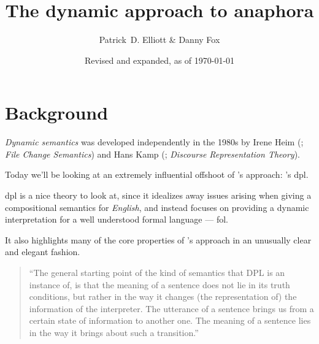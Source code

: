 \documentclass[nols,twoside,nofonts,nobib,nohyper]{tufte-handout}
\title{The dynamic approach to anaphora}
\date{Revised and expanded, as of {\today}}
\author[Patrick D. Elliott \& Danny Fox]{Patrick~D. Elliott \& Danny Fox}
\theoremstyle{definition}
\begin{document}
\maketitle%

\section{Background}

\textit{Dynamic semantics} was developed independently in the 1980s by Irene Heim (\citeyear{Heim1982}; \textit{File Change Semantics}) and Hans Kamp (\citeyear{Kamp1981}; \textit{Discourse Representation Theory}).

Today we'll be looking at an extremely influential offshoot of \citeauthor{Heim1982}'s approach: \citeauthor{GroenendijkStokhof1991}'s \ac{dpl}.

\ac{dpl} is a nice theory to look at, since it idealizes away issues arising when giving a compositional semantics for \textit{English}, and instead focuses on providing a dynamic interpretation for a well understood formal language --- \ac{fol}.

It also highlights many of the core properties of \citeauthor{Heim1982}'s approach in an unusually clear and elegant fashion.

\begin{quotation}
\enquote{The general starting point of the kind of semantics that DPL is
an instance of, is that the meaning of a sentence does not lie in its truth conditions, but rather in the way it changes (the representation of) the information of the interpreter. The utterance
of a sentence brings us from a certain state of information to
another one. The meaning of a sentence lies in the way it brings
about such a transition.}\\
\phantom{,}\hfill\citep[p. 43]{GroenendijkStokhof1991}
\end{quotation}
\end{document}
